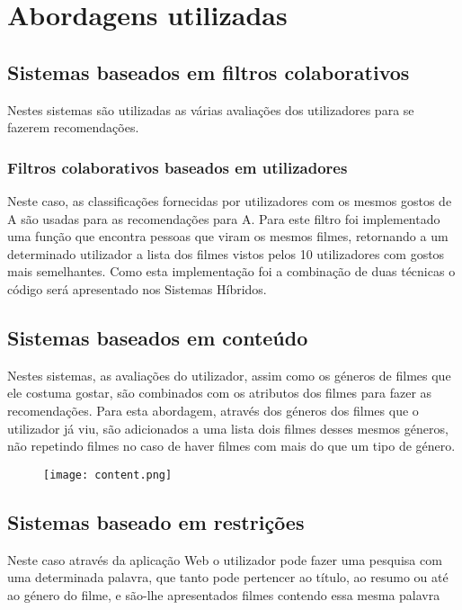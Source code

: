 \section{Abordagens utilizadas}



\subsection{Sistemas baseados em filtros colaborativos}

Nestes sistemas são utilizadas as várias avaliações dos utilizadores para se fazerem recomendações. 

\subsubsection{Filtros colaborativos baseados em utilizadores}

Neste caso, as classificações fornecidas por utilizadores com os mesmos gostos de A são usadas para as recomendações para A.
Para este filtro foi implementado uma função que encontra pessoas que viram os mesmos filmes, retornando a um determinado utilizador a lista dos filmes vistos pelos 10 utilizadores com gostos mais semelhantes. Como esta implementação foi a combinação de duas técnicas o código será apresentado nos Sistemas Híbridos. 


\subsection{Sistemas baseados em conteúdo}

Nestes sistemas, as avaliações do utilizador, assim como os géneros de filmes que ele costuma gostar, são combinados com os atributos dos filmes para fazer as recomendações. 
Para esta abordagem, através dos géneros dos filmes que o utilizador já viu, são adicionados a uma lista dois filmes desses mesmos géneros, não repetindo filmes no caso de haver filmes com mais do que um tipo de género.

\begin{figure}[H]
\centering
\texttt{[image: content.png]}
\end{figure}


\subsection{Sistemas baseado em restrições}
Neste caso através da aplicação Web o utilizador pode fazer uma pesquisa com uma determinada palavra, que tanto pode pertencer ao título, ao resumo ou até ao género do filme, e são-lhe apresentados filmes contendo essa mesma palavra

